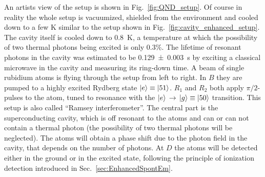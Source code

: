 An artists view of the setup is shown in Fig.~\ref{fig:QND_setup}. Of course in
reality the whole setup is vacuumized, shielded from the environment and cooled
down to a few \si{K} similar to the setup shown in
Fig.~\ref{fig:cavity_enhanced_setup}. The cavity itself is cooled down to
\SI{0.8}{K}, a temperature at which the possibility of two thermal photons being
excited is only 0.3\%. The lifetime of resonant photons in the
cavity was estimated to be \SI{0.129\pm0.003}{s} by exciting a classical microwave in the cavity and
measuring its ring-down time. A beam of single rubidium atoms is flying through
the setup from left to right. In $B$ they are pumped to a highly excited Rydberg
state $\ket{e} \equiv \ket{51}$. $R_1$ and $R_2$ both apply $\pi/2$-pulses to
the atom, tuned to resonance with the
$\ket{e}\,\rightarrow\,\ket{g}\equiv\ket{50}$ transition. This setup is also
called ``Ramsey interferometer''. The central part is the superconducting
cavity, which is off resonant to the atoms and can or can not contain a thermal
photon (the possibility of two thermal photons will be neglected). The atoms
will obtain a phase shift due to the photon field in the cavity, that depends on
the number of photons. At $D$ the atoms will be detected either in the ground or
in the excited state, following the principle of ionization detection introduced
in Sec.~\ref{sec:EnhancedSpontEm}.

